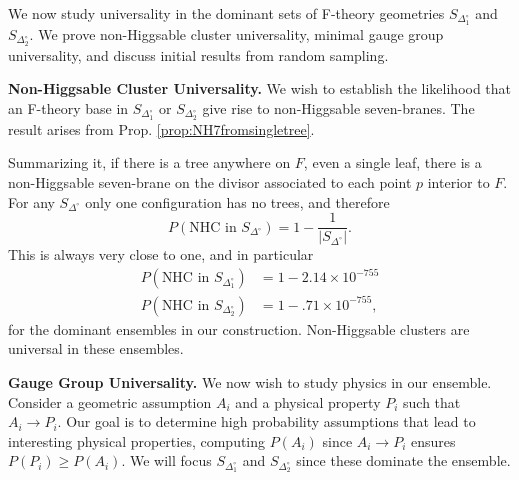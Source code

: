 \documentclass[aps,prl,twocolumn, superscriptaddress,groupedaddress,nofootinbib]{revtex4-1}
\newcommand{\sdoc}{S_{\Delta_1^\circ}}
\newcommand{\sdtc}{S_{\Delta_2^\circ}}
\begin{document}
\vspace{.2cm}

We now study universality in the dominant sets of
F-theory geometries $\sdoc$ and $\sdtc$. We prove non-Higgsable cluster universality, minimal gauge group universality,
and discuss initial results from random sampling.

\vspace{.2cm}
\noindent \textbf{Non-Higgsable Cluster Universality.} We wish to establish
the likelihood that an F-theory base in $\sdoc$ or $\sdtc$ give rise to
non-Higgsable seven-branes. The result arises from Prop. \ref{prop:NH7fromsingletree}.



Summarizing it, if there is a tree anywhere on $F$, even a single leaf, there is a
non-Higgsable seven-brane on the divisor associated to each point $p$ interior to $F$.
For any $S_{\Delta^\circ}$ only one configuration has no trees, and therefore
\begin{equation}
P(\text{NHC in } S_{\Delta^\circ}) = 1 - \frac{1}{|S_{\Delta^\circ}|}.
\end{equation}
This is always very close to one, and in particular
\begin{align}
P(\text{NHC in } \sdoc) &= 1-2.14\times 10^{-755} \nonumber \\
P(\text{NHC in } \sdtc) &= 1-.71\times 10^{-755},
\end{align}
for the dominant ensembles in our construction. Non-Higgsable clusters are universal in these ensembles.

\vspace{.2cm}
\noindent \textbf{Gauge Group Universality.} We now wish to study physics in
our ensemble. Consider a geometric assumption $A_i$
and a physical property $P_i$ such that $A_i\to P_i$. Our goal is to determine high
probability assumptions that lead to interesting physical properties, computing $P(A_i)$
since $A_i\to P_i$ ensures $P(P_i)\geq P(A_i).$ We will focus $\sdoc$ and $\sdtc$ since
these dominate the ensemble.
\end{document}
